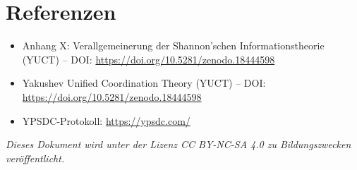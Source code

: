 \documentclass[12pt,a4paper]{article}
\begin{document}
	\section{Referenzen}
	\begin{itemize}
		\item Anhang X: Verallgemeinerung der Shannon'schen Informationstheorie (YUCT) -- DOI: \url{https://doi.org/10.5281/zenodo.18444598}
		\item Yakushev Unified Coordination Theory (YUCT) -- DOI: \url{https://doi.org/10.5281/zenodo.18444598}
		\item YPSDC-Protokoll: \url{https://ypsdc.com/}
	\end{itemize}
	
	\noindent\textit{Dieses Dokument wird unter der Lizenz CC BY-NC-SA 4.0 zu Bildungszwecken veröffentlicht.}
	
\end{document}
